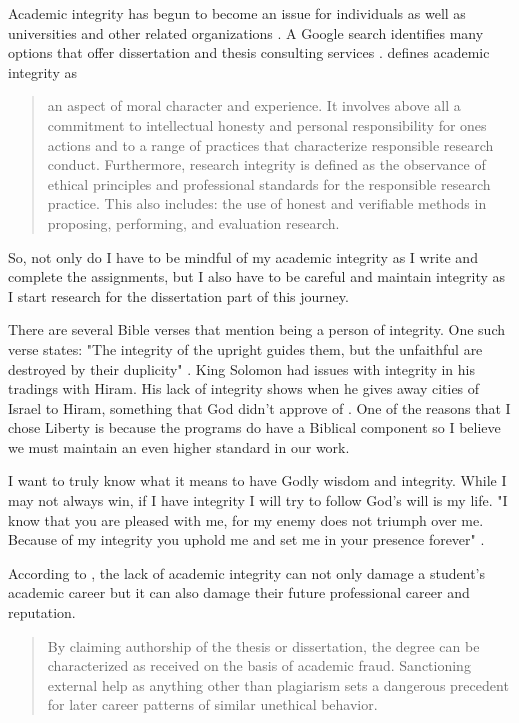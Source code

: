 \documentclass[man]{apa7}
\begin{document}
\setlength{\parindent}{0.5in}
Academic integrity has begun to become an issue for individuals as well as universities and other related organizations \parencite{francisco_scholarly_2017}. A Google search identifies many options that offer dissertation and thesis consulting services \parencite{white_shadow_2016}. \textcite{francisco_scholarly_2017} defines academic integrity as

\blockquote{
an aspect of moral character and experience. It involves above all a commitment to intellectual honesty and personal responsibility for ones actions and to a range of practices that characterize responsible research conduct. Furthermore, research integrity is defined as the observance of ethical principles and professional standards for the responsible research practice. This also includes: the use of honest and verifiable methods in proposing, performing, and evaluation research. 
}

So, not only do I have to be mindful of my academic integrity as I write and complete the assignments, but I also have to be careful and maintain integrity as I start research for the dissertation part of this journey.

\setlength{\parindent}{0.5in}
There are several Bible verses that mention being a person of integrity. One such verse states: "The integrity of the upright guides them, but the unfaithful are destroyed by their duplicity" \parencite[Prov 11:3]{bible}. King Solomon had issues with integrity in his tradings with Hiram. His lack of integrity shows when he gives away cities of Israel to Hiram, something that God didn't approve of \parencite{Merida2015}. One of the reasons that I chose Liberty is because the programs do have a Biblical component so I believe we must maintain an even higher standard in our work. 

\setlength{\parindent}{0.5in}
I want to truly know what it means to have Godly wisdom and integrity. While I may not always win, if I have integrity I will try to follow God's will is my life. "I know that you are pleased with me, for my enemy does not triumph over me. Because of my integrity you uphold me and set me in your presence forever" \parencite[Psalm 41:11-2]{bible}.  

\setlength{\parindent}{0.5in}
According to \textcite{white_shadow_2016}, the lack of academic integrity can not only damage a student's academic career but it can also damage their future professional career and reputation. 

\blockquote{
By claiming authorship of the thesis or dissertation, the degree can be characterized as received on the basis of academic fraud. Sanctioning external help as anything other than plagiarism sets a dangerous precedent for later career patterns of similar unethical behavior. \parencite[p. 4]{white_shadow_2016}
}
\end{document}
